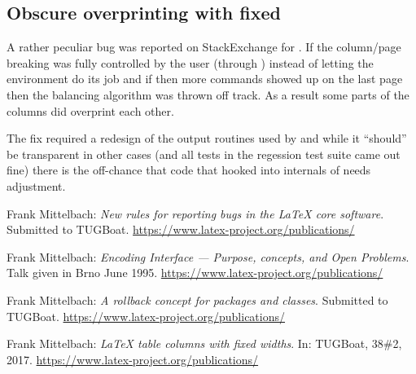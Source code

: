 \documentclass{ltnews}
\begin{document}
\subsection{Obscure overprinting with  fixed}

A rather peculiar bug was reported on StackExchange for
. If the column/page breaking was fully controlled by
the user (through ) instead of letting the environment
do its job and if then more  commands showed up on the
last page then the balancing algorithm was thrown off track.
As a result some parts of the columns did overprint each other.

The fix required a redesign of the output routines used by
 and while it ``should'' be transparent in other cases
(and all tests in the regession test suite came out fine) there is the
off-chance that code that hooked into internals of 
needs adjustment.



\begin{thebibliography}{9}
  
 Frank Mittelbach:
  \emph{New rules for reporting bugs in the \LaTeX{} core software}.  
  Submitted to TUGBoat.
  \url{https://www.latex-project.org/publications/}

 Frank Mittelbach:
  \emph{\LaTeXe{} Encoding Interface --- Purpose, concepts, and 
   Open Problems}.  
  Talk given in Brno June 1995.
  \url{https://www.latex-project.org/publications/}

 Frank Mittelbach:
  \emph{A rollback concept for packages and classes}.  
  Submitted to TUGBoat.
  \url{https://www.latex-project.org/publications/}

 Frank Mittelbach:
  \emph{\LaTeX{} table columns with fixed widths}.  
  In: TUGBoat, 38\#2, 2017.
  \url{https://www.latex-project.org/publications/}

\end{thebibliography}
\end{document}
